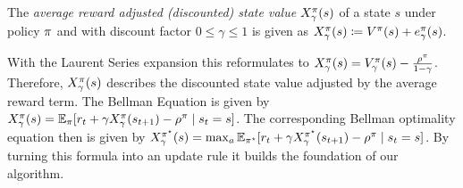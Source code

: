 \documentclass[envcountsame]{llncs}
\begin{document}
\begin{definition}
  The \textit{average reward adjusted (discounted) state value} $X_{\gamma}^{\pi}(s)$ of a state
  $s$ under policy $\pi$ and with discount factor $0 \leqslant \gamma \leqslant 1$ is given as
  \(X_{\gamma}^{\pi}(s) \coloneqq V^{\pi}(s) + e_{\gamma}^{\pi}(s)\).
\end{definition}
%
With the Laurent Series expansion this reformulates to
\(X_{\gamma}^{\pi}(s) = V_{\gamma}^{\pi}(s) - \frac{\rho^{\pi}}{1-\gamma}\). Therefore,
\(X_{\gamma}^{\pi}(s)\) describes the discounted state value adjusted by the average reward term.
The Bellman Equation is given by
\(X_{\gamma}^{\pi}(s) = \operatorname*{\mathbb{E}}_{\pi}[r_{t} + \gamma X_{\gamma}^{\pi}(s_{t+1}) - \rho^{\pi} \mid
s_{t} = s]\). The corresponding Bellman optimality equation then is given by
\(X_{\gamma}^{\pi^{\star}}(s) = \max_{a} \operatorname*{\mathbb{E}}_{\pi^{\star}}[r_{t} + \gamma X_{\gamma}^{\pi^{\star}}(s_{t+1}) -
\rho^{\pi} \mid s_{t} = s]\). By turning this formula into an update rule it builds the
foundation of our algorithm.
\end{document}
